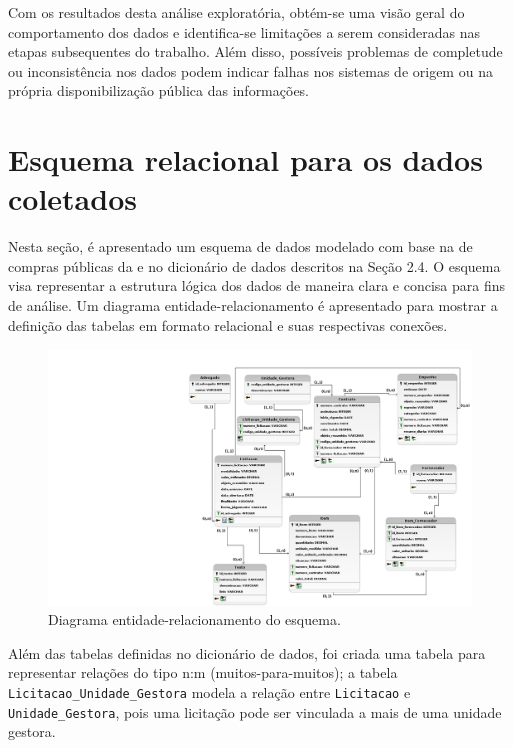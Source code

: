 \documentclass[
	12pt,				%
	oneside,			%
	a4paper,			%
	chapter=TITLE,		%
	section=TITLE,		%
	english,			%
	brazil				%
	]{abntex2}
\begin{document}
Com os resultados desta análise exploratória, obtém-se uma visão geral do comportamento dos dados e identifica-se limitações a serem consideradas nas etapas subsequentes do trabalho. Além disso, possíveis problemas de completude ou inconsistência nos dados podem indicar falhas nos sistemas de origem ou na própria disponibilização pública das informações.

\section{Esquema relacional para os dados coletados}

Nesta seção, é apresentado um esquema de dados modelado com base na  de compras públicas da  e no dicionário de dados descritos na Seção 2.4. O esquema visa representar a estrutura lógica dos dados de maneira clara e concisa para fins de análise. Um diagrama entidade-relacionamento é apresentado para mostrar a definição das tabelas em formato relacional e suas respectivas conexões.

\begin{figure}[h]
\begin{center}
	\caption{\label{fig:diagrama_er}Diagrama entidade-relacionamento do esquema.}
	\includegraphics[trim={17cm 0 0 0},clip,width=\textwidth]{images/modelo_logico_tcc_v4.png} %
\end{center}
\end{figure}

Além das tabelas definidas no dicionário de dados, foi criada uma tabela para representar relações do tipo n:m (muitos-para-muitos); a tabela \texttt{Licitacao\_Unidade\_Gestora} modela a relação entre \texttt{Licitacao} e \texttt{Unidade\_Gestora}, pois uma licitação pode ser vinculada a mais de uma unidade gestora.
\end{document}
